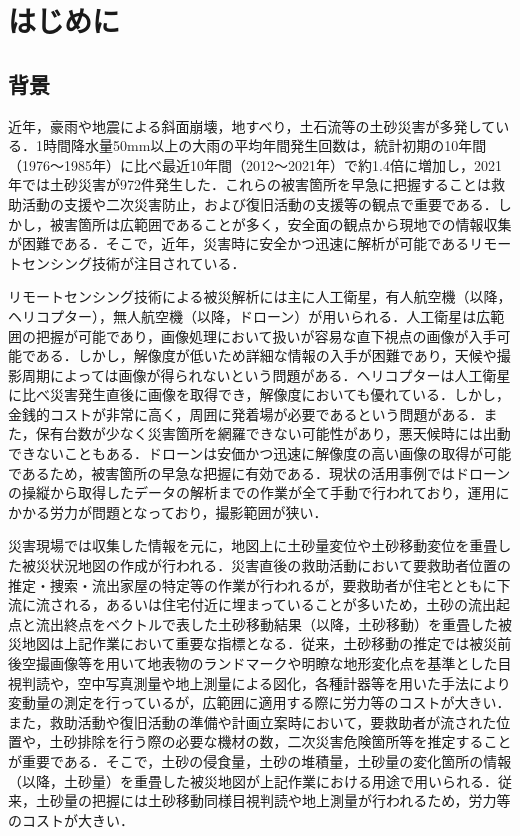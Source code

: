\chapter{はじめに}
  \section{背景}
    近年，豪雨や地震による斜面崩壊，地すべり，土石流等の土砂災害が多発している．1時間降水量50mm以上の大雨の平均年間発生回数は，統計初期の10年間（1976〜1985年）に比べ最近10年間（2012〜2021年）で約1.4倍に増加し，2021年では土砂災害が972件発生した\cite{背景1, 背景2}．これらの被害箇所を早急に把握することは救助活動の支援や二次災害防止，および復旧活動の支援等の観点で重要である．しかし，被害箇所は広範囲であることが多く，安全面の観点から現地での情報収集が困難である\cite{背景3}．そこで，近年，災害時に安全かつ迅速に解析が可能であるリモートセンシング技術が注目されている\cite{背景4}．

    リモートセンシング技術による被災解析には主に人工衛星，有人航空機（以降，ヘリコプター），無人航空機（以降，ドローン）が用いられる．人工衛星は広範囲の把握が可能であり，画像処理において扱いが容易な直下視点の画像が入手可能である．しかし，解像度が低いため詳細な情報の入手が困難であり，天候や撮影周期によっては画像が得られないという問題がある．ヘリコプターは人工衛星に比べ災害発生直後に画像を取得でき，解像度においても優れている．しかし，金銭的コストが非常に高く，周囲に発着場が必要であるという問題がある．また，保有台数が少なく災害箇所を網羅できない可能性があり，悪天候時には出動できないこともある．ドローンは安価かつ迅速に解像度の高い画像の取得が可能であるため，被害箇所の早急な把握に有効である．現状の活用事例ではドローンの操縦から取得したデータの解析までの作業が全て手動で行われており，運用にかかる労力が問題となっており，撮影範囲が狭い\cite{背景5, 背景6, 背景7}．

    災害現場では収集した情報を元に，地図上に土砂量変位や土砂移動変位を重畳した被災状況地図の作成が行われる．災害直後の救助活動において要救助者位置の推定・捜索・流出家屋の特定等の作業が行われるが，要救助者が住宅とともに下流に流される，あるいは住宅付近に埋まっていることが多いため，土砂の流出起点と流出終点をベクトルで表した土砂移動結果（以降，土砂移動）を重畳した被災地図は上記作業において重要な指標となる．従来，土砂移動の推定では被災前後空撮画像等を用いて地表物のランドマークや明瞭な地形変化点を基準とした目視判読や，空中写真測量や地上測量による図化，各種計器等を用いた手法により変動量の測定を行っているが，広範囲に適用する際に労力等のコストが大きい\cite{土砂移動解析背景1, 土砂移動解析背景2}．また，救助活動や復旧活動の準備や計画立案時において，要救助者が流された位置や，土砂排除を行う際の必要な機材の数，二次災害危険箇所等を推定することが重要である．そこで，土砂の侵食量，土砂の堆積量，土砂量の変化箇所の情報（以降，土砂量）を重畳した被災地図が上記作業における用途で用いられる．従来，土砂量の把握には土砂移動同様目視判読や地上測量が行われるため，労力等のコストが大きい\cite{土砂量解析背景1, 土砂量解析背景2}．


